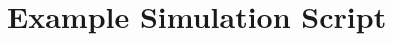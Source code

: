 \chapter{Example Simulation Script} \label{sec:script}

\begin{singlespace}
  \scriptsize
  
\end{singlespace}

\begin{singlespace}
  \scriptsize
  
\end{singlespace}
